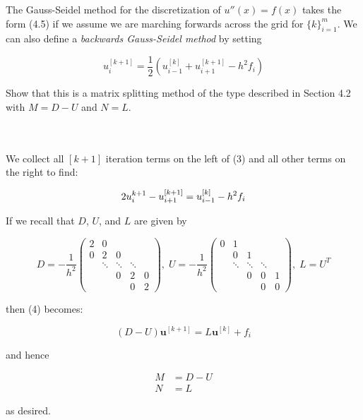 The Gauss-Seidel method for the discretization of $u''(x) = f(x)$ takes the form (4.5) if
we assume we are marching forwards across the grid for $\{k\}_{i=1}^{m}$. We can also
define a \textit{backwards Gauss-Seidel method} by setting

\begin{equation}
    u_i^{[k+1]} = \frac{1}{2} \left(u_{i-1}^{[k]} + u_{i+1}^{[k+1]} - h^2 f_i \right)
\end{equation}

Show that this is a matrix splitting method of the type described in Section 4.2 with
$M = D - U$ and $N = L$.

\begin{solution}\ \\\\
    We collect all $[k+1]$ iteration terms on the left of (3) and all other terms on the right to find:

    \begin{equation}
        2 u_i^{k+1} - u_{i+1}^{[k+1]} = u_{i-1}^{[k]} - h^2 f_i \\
    \end{equation}

    If we recall that $D$, $U$, and $L$ are given by

    \[
    D = -\frac{1}{h^2} \begin{pmatrix} 
         2 &       0 \\
         0 &       2 &      0 \\
           & \ddots & \ddots & \ddots \\
           &        &      0 &      2 &  0 \\
           &        &        &      0 &  2 
    \end{pmatrix},\;
    U = -\frac{1}{h^2} \begin{pmatrix} 
         0 &       1 \\
           &      0 &      1 \\
           & \ddots & \ddots & \ddots \\
           &        &      0 &      0 &  1 \\
           &        &        &      0 &  0 
    \end{pmatrix}, \;
    L = U^T
    \]

    then (4) becomes:

    $$
        (D - U) \textbf{u}^{[k+1]} = L \textbf{u}^{[k]} + f_i
    $$

    and hence 

    \begin{align*}
        M &= D - U \\
        N &= L
    \end{align*}
    
    as desired.
\end{solution}